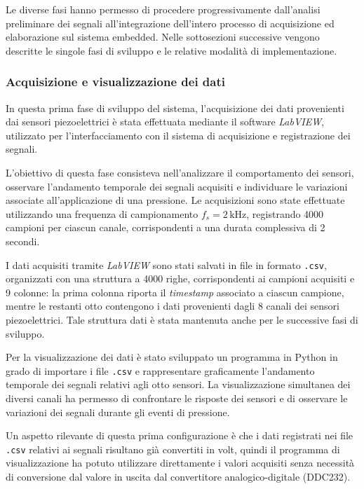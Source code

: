 \documentclass[10pt, a4paper]{article}
\begin{document}
            Le diverse fasi hanno permesso di procedere progressivamente dall'analisi preliminare dei segnali all'integrazione 
            dell'intero processo di acquisizione ed elaborazione sul sistema embedded. Nelle sottosezioni successive vengono descritte le singole fasi di sviluppo e le relative modalità di implementazione.

            \subsubsection{Acquisizione e visualizzazione dei dati}
                In questa prima fase di sviluppo del sistema, l'acquisizione dei dati provenienti dai sensori piezoelettrici è stata effettuata mediante il software \textit{LabVIEW}, utilizzato per l'interfacciamento
                con il sistema di acquisizione e registrazione dei segnali.

                L'obiettivo di questa fase consisteva nell'analizzare il comportamento dei sensori, osservare l'andamento temporale dei segnali acquisiti e individuare le variazioni 
                associate all'applicazione di una pressione. Le acquisizioni sono state effettuate utilizzando una frequenza di 
                campionamento  $f_s = 2\,\mathrm{kHz}$, registrando 4000 campioni per ciascun canale, corrispondenti a una durata complessiva di 2 secondi.

                I dati acquisiti tramite \textit{LabVIEW} sono stati salvati in file in formato \texttt{.csv}, organizzati con una struttura a 4000 righe, corrispondenti ai campioni
                acquisiti e 9 colonne: la prima colonna riporta il \textit{timestamp} associato a ciascun campione, mentre le restanti otto 
                contengono i dati provenienti dagli 8 canali dei sensori piezoelettrici. Tale struttura dati è stata mantenuta anche per le successive fasi di sviluppo.

                Per la visualizzazione dei dati è stato sviluppato un programma in Python in grado di importare i file \texttt{.csv} e rappresentare graficamente 
                l'andamento temporale dei segnali relativi agli otto sensori. La visualizzazione simultanea dei diversi canali ha permesso di confrontare 
                le risposte dei sensori e di osservare le variazioni dei segnali durante gli eventi di pressione.

                Un aspetto rilevante di questa prima configurazione è che i dati registrati nei file \texttt{.csv} relativi ai segnali risultano già convertiti in volt,
                quindi il programma di visualizzazione ha potuto utilizzare direttamente i valori acquisiti senza necessità di conversione dal valore in uscita dal
                convertitore analogico-digitale (DDC232).
\end{document}
